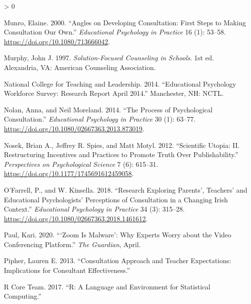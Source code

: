 \documentclass[
]{article}
\newlength{\cslhangindent}
\newenvironment{CSLReferences}[2] %
 {%
  \setlength{\parindent}{0pt}
  \ifodd #1 \everypar{\setlength{\hangindent}{\cslhangindent}}\ignorespaces\fi
  \ifnum #2 > 0
  \setlength{\parskip}{#2\baselineskip}
  \fi
 }%
 {}
\begin{document}
\begin{CSLReferences}{1}{0}
\leavevmode\hypertarget{ref-munroAnglesDevelopingConsultation2000}{}%
Munro, Elaine. 2000. {``Angles on {Developing Consultation}: {First}
Steps to Making Consultation Our Own.''} \emph{Educational Psychology in
Practice} 16 (1): 53--58. \url{https://doi.org/10.1080/713666042}.

\leavevmode\hypertarget{ref-murphySolutionfocusedCounselingSchools1997}{}%
Murphy, John J. 1997. \emph{Solution-Focused Counseling in Schools}. 1st
ed. {Alexandria, VA}: {American Counseling Association}.

\leavevmode\hypertarget{ref-nationalcollegeforteachingandleadershipEducationalPsychologyWorkforce2014}{}%
National College for Teaching and Leadership. 2014. {``Educational
Psychology Workforce Survey: {Research} Report {April} 2014.''}
{Manchester, NH: NCTL}.

\leavevmode\hypertarget{ref-nolanProcessPsychologicalConsultation2014}{}%
Nolan, Anna, and Neil Moreland. 2014. {``The Process of Psychological
Consultation.''} \emph{Educational Psychology in Practice} 30 (1):
63--77. \url{https://doi.org/10.1080/02667363.2013.873019}.

\leavevmode\hypertarget{ref-nosekScientificUtopiaII2012a}{}%
Nosek, Brian A., Jeffrey R. Spies, and Matt Motyl. 2012. {``Scientific
{Utopia}: {II}. {Restructuring Incentives} and {Practices} to {Promote
Truth Over Publishability}.''} \emph{Perspectives on Psychological
Science} 7 (6): 615--31. \url{https://doi.org/10.1177/1745691612459058}.

\leavevmode\hypertarget{ref-ofarrellResearchExploringParents2018}{}%
O'Farrell, P., and W. Kinsella. 2018. {``Research Exploring Parents',
Teachers' and Educational Psychologists' Perceptions of Consultation in
a Changing {Irish} Context.''} \emph{Educational Psychology in Practice}
34 (3): 315--28. \url{https://doi.org/10.1080/02667363.2018.1461612}.

\leavevmode\hypertarget{ref-paulZoomMalwareWhy2020}{}%
Paul, Kari. 2020. {``{`{Zoom} Is Malware'}: Why Experts Worry about the
Video Conferencing Platform.''} \emph{The Guardian}, April.

\leavevmode\hypertarget{ref-pipherConsultationApproachTeacher2013a}{}%
Pipher, Lauren E. 2013. {``Consultation Approach and Teacher
Expectations: {Implications} for Consultant Effectiveness.''}

\leavevmode\hypertarget{ref-rcoreteamLanguageEnvironmentStatistical2017}{}%
R Core Team. 2017. {``R: {A} Language and Environment for Statistical
Computing.''}


\end{CSLReferences}
\end{document}
